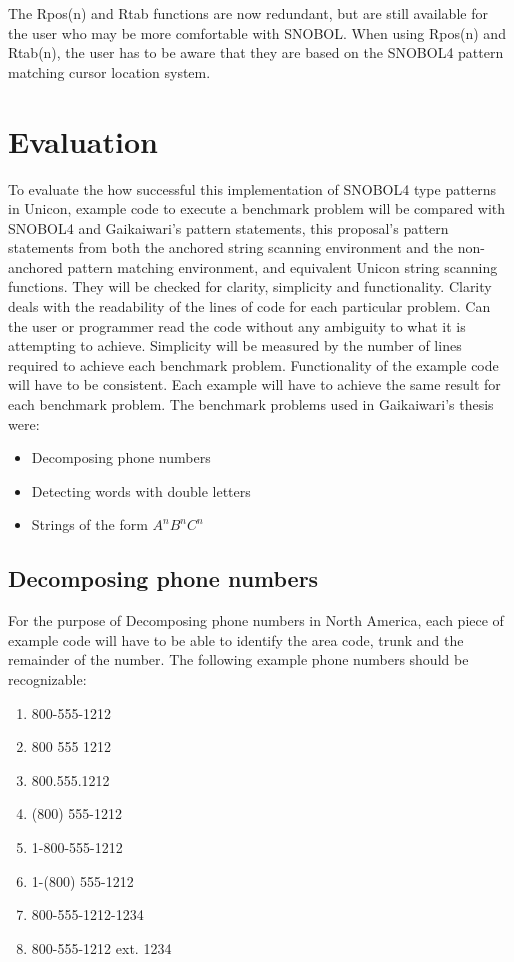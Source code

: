 \documentclass{article}
\begin{document}
The Rpos(n) and Rtab functions are now redundant, but are still available for the user who may be more comfortable with SNOBOL.  When using Rpos(n) and Rtab(n), the user has to be aware that they are based on the SNOBOL4 pattern matching cursor location system.

\section{Evaluation}
To evaluate the how successful this implementation of SNOBOL4 type patterns in Unicon, example code to execute a benchmark problem will be compared with SNOBOL4 and Gaikaiwari's pattern statements, this proposal's pattern statements  from both the anchored string scanning environment and the non-anchored pattern matching environment, and equivalent Unicon string scanning functions.  They will be checked for clarity, simplicity and functionality.  Clarity deals with the readability of the lines of code for each particular problem.  Can the user or programmer read the code without any ambiguity to what it is attempting to achieve.  Simplicity will be measured by the number of lines required to achieve each benchmark problem.  Functionality of the example code will have to be consistent.  Each example will have to achieve the same result for each benchmark problem.  The benchmark problems used in Gaikaiwari's thesis were:

\begin{itemize}
\item Decomposing phone numbers
\item Detecting words with double letters
\item Strings of the form \emph{$A^nB^nC^n$}
\end{itemize}

\subsection{Decomposing phone numbers}
For the purpose of Decomposing phone numbers in North America, each piece of example code will have to be able to identify the area code, trunk and the remainder of the number.  The following example phone numbers should be recognizable:

\begin{enumerate}
\item 800-555-1212
\item 800 555 1212
\item 800.555.1212
\item (800) 555-1212
\item 1-800-555-1212
\item 1-(800) 555-1212
\item 800-555-1212-1234
\item 800-555-1212 ext. 1234
\end{enumerate}
\end{document}
